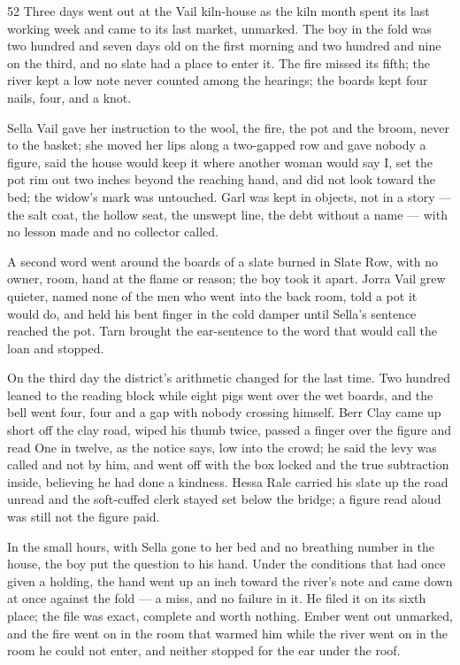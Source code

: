 \begin{CRchronicle}{52}
Three days went out at the Vail kiln-house as the kiln month spent its last working week and came to its last market, unmarked. The boy in the fold was two hundred and seven days old on the first morning and two hundred and nine on the third, and no slate had a place to enter it. The fire missed its fifth; the river kept a low note never counted among the hearings; the boards kept four nails, four, and a knot.

Sella Vail gave her instruction to the wool, the fire, the pot and the broom, never to the basket; she moved her lips along a two-gapped row and gave nobody a figure, said the house would keep it where another woman would say I, set the pot rim out two inches beyond the reaching hand, and did not look toward the bed; the widow’s mark was untouched. Garl was kept in objects, not in a story --- the salt coat, the hollow seat, the unswept line, the debt without a name --- with no lesson made and no collector called.

A second word went around the boards of a slate burned in Slate Row, with no owner, room, hand at the flame or reason; the boy took it apart. Jorra Vail grew quieter, named none of the men who went into the back room, told a pot it would do, and held his bent finger in the cold damper until Sella’s sentence reached the pot. Tarn brought the ear-sentence to the word that would call the loan and stopped.

On the third day the district’s arithmetic changed for the last time. Two hundred leaned to the reading block while eight pigs went over the wet boards, and the bell went four, four and a gap with nobody crossing himself. Berr Clay came up short off the clay road, wiped his thumb twice, passed a finger over the figure and read One in twelve, as the notice says, low into the crowd; he said the levy was called and not by him, and went off with the box locked and the true subtraction inside, believing he had done a kindness. Hessa Rale carried his slate up the road unread and the soft-cuffed clerk stayed set below the bridge; a figure read aloud was still not the figure paid.

In the small hours, with Sella gone to her bed and no breathing number in the house, the boy put the question to his hand. Under the conditions that had once given a holding, the hand went up an inch toward the river’s note and came down at once against the fold --- a miss, and no failure in it. He filed it on its sixth place; the file was exact, complete and worth nothing. Ember went out unmarked, and the fire went on in the room that warmed him while the river went on in the room he could not enter, and neither stopped for the ear under the roof.
\end{CRchronicle}
